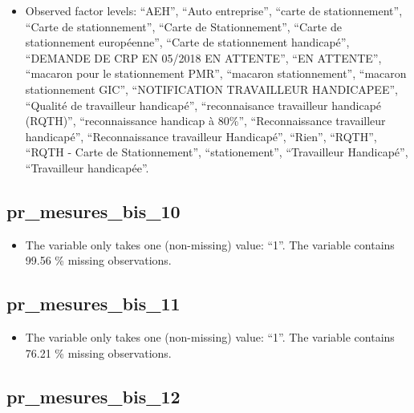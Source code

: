 \documentclass[
  letterpaper,
  DIV=11,
  numbers=noendperiod]{scrartcl}
\providecommand{\tightlist}{%
  \setlength{\itemsep}{0pt}\setlength{\parskip}{0pt}}
\begin{document}
\emini

\begin{itemize}
\tightlist
\item
  Observed factor levels: ``AEH'', ``Auto entreprise'', ``carte de
  stationnement'', ``Carte de stationnement'', ``Carte de
  Stationnement'', ``Carte de stationnement européenne'', ``Carte de
  stationnement handicapé'', ``DEMANDE DE CRP EN 05/2018 EN ATTENTE'',
  ``EN ATTENTE'', ``macaron pour le stationnement PMR'', ``macaron
  stationnement'', ``macaron stationnement GIC'', ``NOTIFICATION
  TRAVAILLEUR HANDICAPEE'', ``Qualité de travailleur handicapé'',
  ``reconnaisance travailleur handicapé (RQTH)'', ``reconnaissance
  handicap à 80\%'', ``Reconnaissance travailleur handicapé'',
  ``Reconnaissance travailleur Handicapé'', ``Rien'', ``RQTH'', ``RQTH -
  Carte de Stationnement'', ``stationement'', ``Travailleur Handicapé'',
  ``Travailleur handicapée''.
\end{itemize}

\fullline

\subsection{pr\_mesures\_bis\_10}\label{pr_mesures_bis_10}

\begin{itemize}
\tightlist
\item
  The variable only takes one (non-missing) value: ``1''. The variable
  contains 99.56 \% missing observations.
\end{itemize}

\fullline

\subsection{pr\_mesures\_bis\_11}\label{pr_mesures_bis_11}

\begin{itemize}
\tightlist
\item
  The variable only takes one (non-missing) value: ``1''. The variable
  contains 76.21 \% missing observations.
\end{itemize}

\fullline

\subsection{pr\_mesures\_bis\_12}\label{pr_mesures_bis_12}
\end{document}
